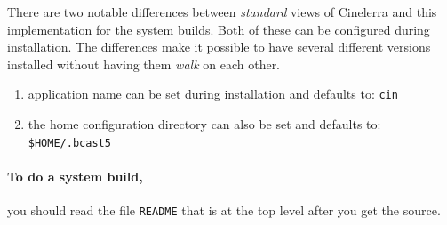 There are two notable differences between \textit{standard} views of Cinelerra and this implementation for the system builds.  
Both of these can be configured during installation.  
The differences make it possible to have several different versions installed without having them \textit{walk} on each other. 

\begin{enumerate}
    \item 
        application name can be set during installation and defaults to: \texttt{cin}
    \item 
        the home configuration directory can also be set and defaults to:\\ \texttt{\$HOME/.bcast5}
\end{enumerate}

\paragraph{To do a system build,} you should read the file \texttt{README} that is at the top level after you get the source.


